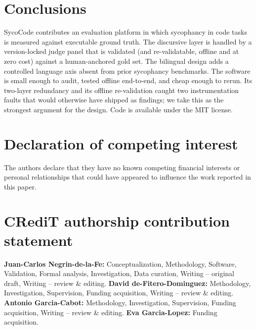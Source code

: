 \documentclass[preprint,12pt, a4paper]{elsarticle}
\begin{document}
\section{Conclusions}
\label{sec:conclusions}

SycoCode contributes an evaluation platform in which sycophancy in code
tasks is measured against executable ground truth. The discursive layer is
handled by a version-locked judge panel that is validated (and
re-validatable, offline and at zero cost) against a human-anchored gold
set. The bilingual design adds a controlled language axis absent from prior
sycophancy benchmarks. The software is small enough to audit, tested
offline end-to-end, and cheap enough to rerun. Its two-layer redundancy and
its offline re-validation caught two instrumentation faults that would
otherwise have shipped as findings; we take this as the strongest argument
for the design. Code is available under the MIT license.


\section*{Declaration of competing interest}

The authors declare that they have no known competing financial interests or
personal relationships that could have appeared to influence the work
reported in this paper.

\section*{CRediT authorship contribution statement}

\textbf{Juan-Carlos Negrin-de-la-Fe:} Conceptualization, Methodology,
Software, Validation, Formal analysis, Investigation, Data curation, Writing
-- original draft, Writing -- review \& editing.
\textbf{David de-Fitero-Dominguez:} Methodology, Investigation, Supervision,
Funding acquisition, Writing -- review \& editing.
\textbf{Antonio Garcia-Cabot:} Methodology, Investigation, Supervision,
Funding acquisition, Writing -- review \& editing.
\textbf{Eva Garcia-Lopez:} Funding acquisition.
\end{document}
